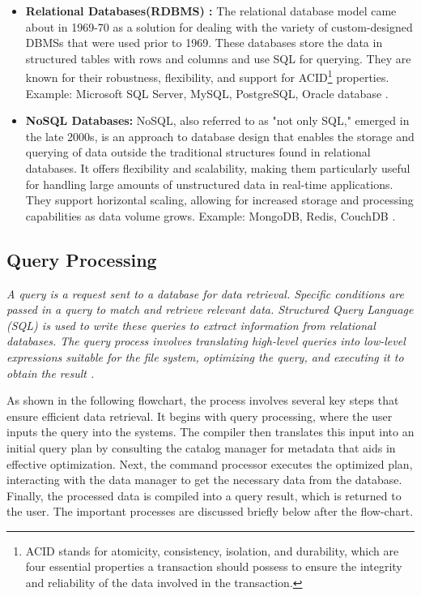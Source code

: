 \begin{itemize}
    \item \textbf{Relational Databases(RDBMS) :} The relational database model came about in 1969-70 as a solution for dealing with the variety of custom-designed DBMSs that were used prior to 1969. These databases store the data in structured tables with rows and columns and use SQL for querying. They are known for their robustness, flexibility, and support for ACID\footnote{ACID stands for atomicity, consistency, isolation, and durability, which are four essential properties a transaction should possess to ensure the integrity and reliability of the data involved in the transaction.} properties. Example: Microsoft SQL Server, MySQL, PostgreSQL, Oracle database \cite{editor-2024,foote-2023}.
    
    \item \textbf{NoSQL Databases:} NoSQL, also referred to as "not only SQL," emerged in the late 2000s, is an approach to database design that enables the storage and querying of data outside the traditional structures found in relational databases. It offers flexibility and scalability, making them particularly useful for handling large amounts of unstructured data in real-time applications. They support horizontal scaling, allowing for increased storage and processing capabilities as data volume grows. Example: MongoDB, Redis, CouchDB \cite{ibm-2024,justacademy_nosql_characteristics}.
\end{itemize}

\subsection{Query Processing }
\noindent\textit{A query is a request sent to a database for data retrieval. Specific conditions are passed in a query to match and retrieve relevant data. Structured Query Language (SQL) is used to write these queries to extract information from relational databases. The query process involves translating high-level queries into low-level expressions suitable for the file system, optimizing the query, and executing it to obtain the result \cite{wwwnaukricom-no-date}.}\vspace{.4cm}

As shown in the following flowchart, the process involves several key steps that ensure efficient data retrieval. It begins with query processing, where the user inputs the query into the systems. The compiler then translates this input into an initial query plan by consulting the catalog manager for metadata that aids in effective optimization. Next, the command processor executes the optimized plan, interacting with the data manager to get the necessary data from the database. Finally, the processed data is compiled into a query result, which is returned to the user. The important processes are discussed briefly below after the flow-chart.

